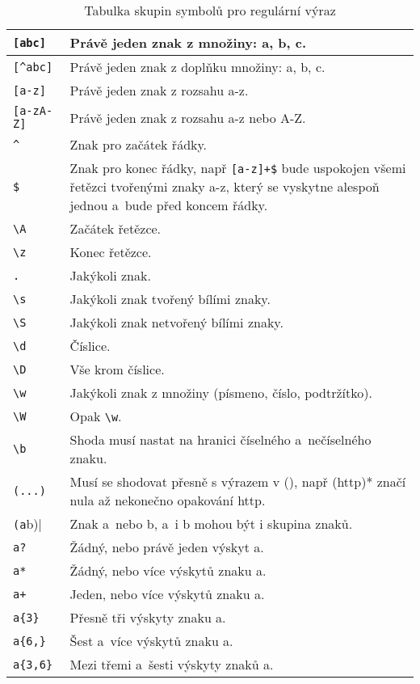 \begin{table}[h!]
\centering
\begin{tabular}{| p{} | p{} |}
\hline
\verb|[abc]| & Právě jeden znak z množiny: a, b, c. \\
\hline
\verb|[^abc]| & Právě jeden znak z doplňku množiny: a, b, c. \\
\hline
\verb|[a-z]| & Právě jeden znak z rozsahu a-z. \\
\hline
\verb|[a-zA-Z]| & Právě jeden znak z rozsahu a-z nebo A-Z. \\
\hline
\verb|^| & Znak pro začátek řádky. \\
\hline
\verb|$| & Znak pro konec řádky, např \verb|[a-z]+$| bude uspokojen všemi řetězci tvořenými znaky a-z, který se vyskytne alespoň jednou a~bude před koncem řádky. \\
\hline
\verb|\A| & Začátek řetězce. \\
\hline
\verb|\z| & Konec řetězce. \\
\hline
\verb|.| & Jakýkoli znak. \\
\hline
\verb|\s| & Jakýkoli znak tvořený bílími znaky. \\
\hline
\verb|\S| & Jakýkoli znak netvořený bílími znaky. \\
\hline
\verb|\d| & Číslice. \\
\hline
\verb|\D| & Vše krom číslice. \\
\hline
\verb|\w| & Jakýkoli znak z množiny (písmeno, číslo, podtržítko). \\
\hline
\verb|\W| & Opak \verb|\w|. \\
\hline
\verb|\b| & Shoda musí nastat na hranici číselného a~nečíselného znaku. \\
\hline
\verb|(...)| & Musí se shodovat přesně s výrazem v (), např (http)* značí nula až nekonečno opakování http. \\
\hline
\verb|(a|b)| & Znak a~nebo b, a~i b mohou být i skupina znaků. \\
\hline
\verb|a?| & Žádný, nebo právě jeden výskyt a. \\
\hline
\verb|a*| & Žádný, nebo více výskytů znaku a. \\
\hline
\verb|a+| & Jeden, nebo více výskytů znaku a. \\
\hline
\verb|a{3}| & Přesně tři výskyty znaku a. \\
\hline
\verb|a{6,}| & Šest a~více výskytů znaku a. \\
\hline
\verb|a{3,6}| & Mezi třemi a~šesti výskyty znaků a. \\
\hline
\end{tabular}
\caption[Tabulka skupin symbolů pro regulární výraz]{Tabulka skupin symbolů pro regulární výraz}\label{tab:regexpr}
\end{table}

